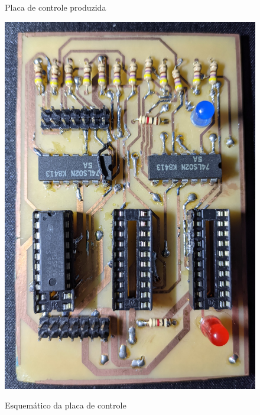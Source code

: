 \begin{figure}[H]
    \begin{minipage}{.5\textwidth}
        \centering
        \caption{Placa de controle produzida}
        \includegraphics[keepaspectratio=true, width=0.9\linewidth]
            {img/placa-controle.jpg}
        \label{fig:placaControle}
    \end{minipage}%
    \begin{minipage}{.5\textwidth}
        \centering
        \caption{Esquemático da placa de controle}

\end{minipage}
\end{figure}
